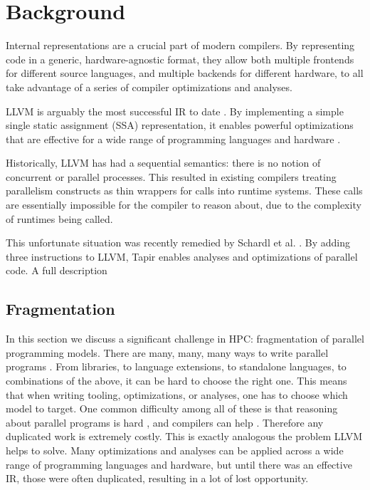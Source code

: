 \documentclass[sigconf]{acmart}
\begin{document}
\section{Background} \label{Sec:Background}

Internal representations are a crucial part of modern compilers. By representing
code in a generic, hardware-agnostic format, they allow both multiple frontends for
different source languages, and multiple backends for different hardware, to all
take advantage of a series of compiler optimizations and analyses. 

LLVM is arguably the most successful IR to date \cite{llvm}. By implementing a simple
single static assignment (SSA) representation, it enables powerful optimizations 
that are effective for a wide range of programming languages and hardware
\cite{llvm imps}. 

Historically, LLVM has had a sequential semantics: there is no notion of
concurrent or parallel processes. This resulted in existing compilers treating 
parallelism constructs as thin wrappers for calls into runtime systems. These
calls are essentially impossible for the compiler to reason about, due to the
complexity of runtimes being called. 

This unfortunate situation was recently remedied by Schardl et al.
\cite{tapir}. By adding three instructions to LLVM, Tapir enables analyses and
optimizations of parallel code. A full description 

\subsection{Fragmentation}

In this section we discuss a significant challenge in HPC: fragmentation of
parallel programming models. There are many, many, many ways to write
parallel programs \cite{....}. From libraries, to language extensions, to
standalone languages, to combinations of the above, it can be hard to choose
the right one. This means that when writing tooling, optimizations, or
analyses, one has to choose which model to target. One common difficulty among
all of these is that reasoning about parallel programs is hard \cite{}, and
compilers can help \cite{}. Therefore any duplicated work is extremely costly.
This is exactly analogous the problem LLVM helps to solve. Many optimizations
and analyses can be applied across a wide range of programming languages and 
hardware, but until there was an effective IR, those were often duplicated, 
resulting in a lot of lost opportunity. 
\end{document}
